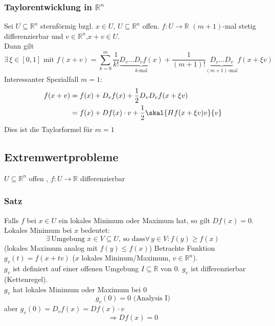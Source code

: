 \subsubsection{Taylorentwicklung in $\mathbb{R}^n$} %
\label{ssub:taylorentwicklung_in_rn}
Sei $U \subseteq \mathbb{R}^n$ sternförmig bzgl. $x \in U$, $ U \subseteq \mathbb{R}^n$ offen. $ f: U \to \mathbb{R} $ $(m+1)$-mal stetig differenzierbar und $v \in \mathbb{R}^n$,$x+v \in U$. \\
Dann gilt
\[
	\exists\,\xi \in [0,1] \text{ mit } f(x+v)
	=\sum_{k=0}^{m}\frac{1}{k!} \underset{k \text{-mal}}{\underbrace{D_v \dots D_vf(x)}}+ \frac{1}{(m+1)!}\underset{(m+1)
	 \text{-mal}}{\underbrace{D_v \dots D_v}}f(x+ \xi v)
\]
Interessanter Spezialfall $m=1$:
\begin{align*}
	f(x+v)&=f(x)+ D_vf(x)+ \frac{1}{2}D_vD_vf(x+\xi v) \\
	&= f(x) + Df(x) \cdot v + \frac{1}{2} \skal{Hf(x+ \xi v)v}{v}
\end{align*}
Dies ist die Taylorformel für $m=1$
\subsection{Extremwertprobleme} %
\label{sub:extremwertprobleme}
$ U \subseteq \mathbb{R}^n$ offen , $ f: U \to \mathbb{R} $ differenzierbar
\subsubsection{Satz} %
\label{ssub:satz}
Falls $f$ bei $x \in U$ ein lokales Minimum oder Maximum hat, so gilt $Df(x)=0$. \\
Lokales Minimum bei $x$ bedeutet:
\[
	\exists\, \text{Umgebung }x \in V \subseteq U \text{, so dass} \forall\, y \in V: f(y) \geq f(x)
\]
(lokales Maximum analog mit $f(y)\leq f(x)$)
Betrachte Funktion $g_v(t)=f(x+tv)$ ($x$ lokales Mininum/Maximum, $v \in \mathbb{R}^n$). \\
$g_v$ ist definiert auf einer offenen Umgebung $I \subseteq \mathbb{R}$ von $0$. $g_v$ ist differenzierbar (Kettenregel).
\\ $g_v$ hat lokales Minimum oder Maximum bei $0$
\[
	g_v(0)=0 \text{ (Analysis I)}
\]
aber $g_v(0)=D_vf(x)=Df(x)\cdot v$
\[
	\Rightarrow Df(x)=0
\] \bewende

